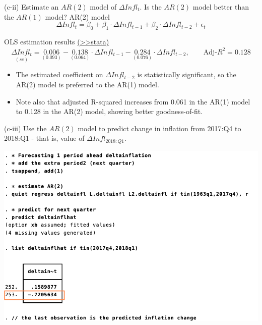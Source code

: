 \documentclass[
  10pt,
  ignorenonframetext,
]{beamer}
\providecommand{\tightlist}{%
  \setlength{\itemsep}{0pt}\setlength{\parskip}{0pt}}
\begin{document}
\begin{frame}{(c-ii) Estimate an \(AR(2)\) model of \(\Delta Infl_t\).
Is the \(AR(2)\) model better than the \(AR(1)\) model?}
\protect\hypertarget{AR2-A}{}
AR(2) model \[
\Delta Infl_t = \beta_0 + \beta_1 \cdot \Delta Infl_{t-1} + \beta_2 \cdot \Delta Infl_{t-2} +\epsilon_t
\]

\pause

OLS estimation results
\footnotesize \protect\hyperlink{AR2}{(\textgreater\textgreater stata)}
\normalsize \[
\underset{(se)}{\widehat{\Delta Infl_t}} = \underset{(0.093)}{0.006} -  \underset{(0.064)}{0.138} \cdot \Delta Infl_{t-1} - \underset{(0.076)}{0.284} \cdot \Delta Infl_{t-2},\qquad \text{Adj-}R^2=0.128
\]

\begin{itemize}
\tightlist
\item
  The estimated coefficient on \(\Delta Infl_{t-2}\) is statistically
  significant, so the AR(2) model is preferred to the AR(1) model.
\item
  Note also that adjusted R-squared increases from 0.061 in the AR(1)
  model to 0.128 in the AR(2) model, showing better goodness-of-fit.
\end{itemize}
\end{frame}

\begin{frame}{(c-iii) Use the \(AR(2)\) model to predict change in
inflation from 2017:Q4 to 2018:Q1 - that is, value of
\(\Delta Infl_{2018:Q1}\).}
\protect\hypertarget{c-iii-use-the-ar2-model-to-predict-change-in-inflation-from-2017q4-to-2018q1---that-is-value-of-delta-infl_2018q1.}{}
\begin{flushleft}\includegraphics[width=0.9\linewidth]{pictures/(ciii)forecasting} \end{flushleft}
\end{frame}
\end{document}
